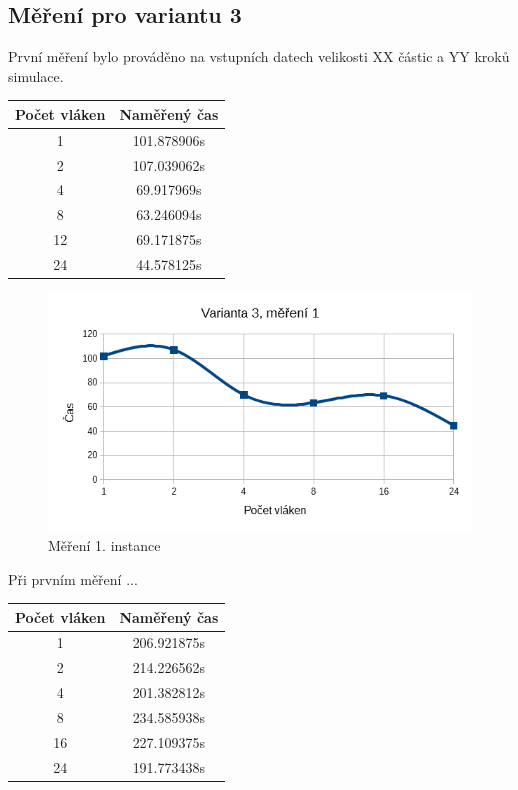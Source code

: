 \documentclass[12pt]{article}
\begin{document}
\subsection{Měření pro variantu 3}
První měření bylo prováděno na vstupních datech velikosti XX částic a YY kroků simulace.

\begin{center}
\begin{tabular}{ c | c }
\textbf{Počet vláken} & \textbf{Naměřený čas} \\ \hline \hline 
1 & 101.878906s \\ \hline
2 & 107.039062s \\ \hline
4 & 69.917969s \\ \hline
8 & 63.246094s \\ \hline
12 & 69.171875s \\ \hline
24 & 44.578125s \\ \hline
\end{tabular}
\end{center}

\begin{figure}[h]
  \begin{center}
     \includegraphics[width=12cm]{images/ssef1.png}
    \caption{Měření 1. instance} 
  \end{center}
\end{figure}

Při prvním měření ...



\begin{center}
\begin{tabular}{ c | c }
\textbf{Počet vláken} & \textbf{Naměřený čas} \\ \hline \hline 
1 & 206.921875s \\ \hline
2 & 214.226562s \\ \hline
4 & 201.382812s \\ \hline
8 & 234.585938s \\ \hline
16 & 227.109375s \\ \hline
24 & 191.773438s \\ \hline
\end{tabular}
\end{center}
\end{document}

